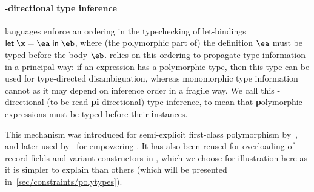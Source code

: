 \documentclass[acmsmall,screen,nonacm,review]{acmart}
\begin{document}
\paragraph{\Geninst-directional type inference}

\ML languages enforce an ordering in the typechecking of let-bindings
$\elet \x \ea \eb$, where (the polymorphic part of) the definition
$\ea$ must be typed before the body $\eb$. \OCaml relies on this
ordering to propagate type information in a principal way: if an
expression has a polymorphic type, then this type can be used for
type-directed disambiguation, whereas monomorphic type information
cannot as it may depend on inference order in a fragile way. We call this
\textbf{\geninst}-directional (to be read \textbf{pi}-directional)
type inference, to mean that \textbf{p}olymorphic expressions must be
typed before their \textbf{i}nstances.

This mechanism was introduced for semi-explicit first-class
polymorphism by~\citet {Garrigue-Remy/poly-ml}, and later used
by~\citet {LeBotlan-Remy/recasting-mlf} for empowering \MLF. It has
also been reused for overloading of record fields and variant
constructors in \OCaml, which we choose for illustration here as it is
simpler to explain than others (which will be
 presented in~\cref{sec/constraints/polytypes}).
\end{document}
